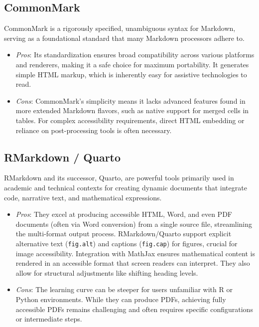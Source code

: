 \subsection{CommonMark}
CommonMark is a rigorously specified, unambiguous syntax for Markdown, serving as a foundational standard that many Markdown processors adhere to. \supercite{MarkdownGuideExtended, DocsToMarkdown, QuartoCommonMark}
\begin{itemize}
	\item \emph{Pros}: Its standardization ensures broad compatibility across various platforms and renderers, making it a safe choice for maximum portability. \supercite{QuartoCommonMark, MConverter} It generates simple HTML markup, which is inherently easy for assistive technologies to read. \supercite{SmashingMagazine}
	\item \emph{Cons}: CommonMark's simplicity means it lacks advanced features found in more extended Markdown flavors, such as native support for merged cells in tables. \supercite{DocsToMarkdown} For complex accessibility requirements, direct HTML embedding or reliance on post-processing tools is often necessary. \supercite{DocsToMarkdown}
\end{itemize}

\subsection{RMarkdown / Quarto}
RMarkdown and its successor, Quarto, are powerful tools primarily used in academic and technical contexts for creating dynamic documents that integrate code, narrative text, and mathematical expressions. \supercite{RMarkdownMassey, QuartoCommonMark}
\begin{itemize}
	\item \emph{Pros}: They excel at producing accessible HTML, Word, and even PDF documents (often via Word conversion) from a single source file, streamlining the multi-format output process. \supercite{QuartoCommonMark, AccessR} RMarkdown/Quarto support explicit alternative text (\texttt{fig.alt}) and captions (\texttt{fig.cap}) for figures, crucial for image accessibility. \supercite{RMarkdownMassey, AccessR} Integration with MathJax ensures mathematical content is rendered in an accessible format that screen readers can interpret. \supercite{CreateUW, RMarkdownMassey} They also allow for structural adjustments like shifting heading levels. \supercite{QuartoCommonMark}
	\item \emph{Cons}: The learning curve can be steeper for users unfamiliar with R or Python environments. While they can produce PDFs, achieving fully accessible PDFs remains challenging and often requires specific configurations or intermediate steps. \supercite{CreateUW, QuartoCommonMark}
\end{itemize}

